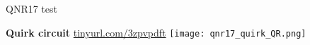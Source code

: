 \documentclass[final]{beamer}
\newlength{\sepwidth}
\newlength{\circwidth}
\newcommand{\separatorcolumn}{\begin{column}{\sepwidth}\end{column}}
\begin{document}
\begin{frame}[t]
\begin{columns}[t]
\begin{column}{\circwidth}
\begin{block}{QNR17 test}
\begin{center}
    {\bf Quirk circuit}
    \url{tinyurl.com/3zpvpdft}
  \texttt{[image: qnr17\_quirk\_QR.png]}
  \end{center}

  \end{block}
  
\end{column}

\separatorcolumn
\end{columns}
\end{frame}
\end{document}
